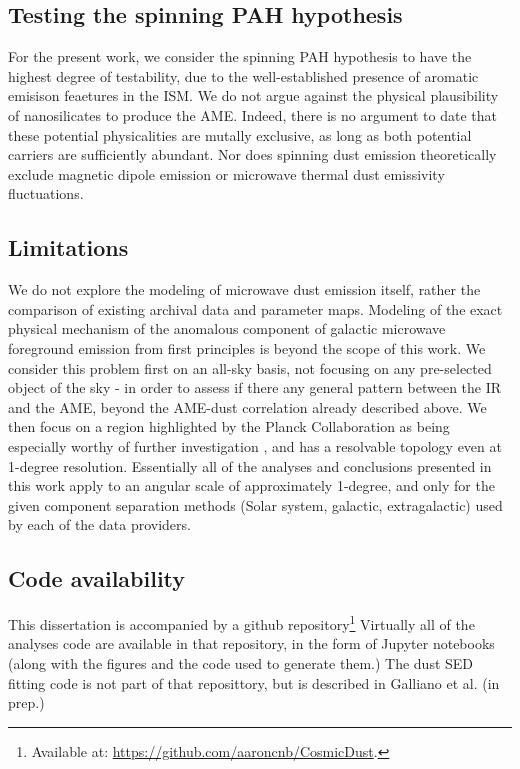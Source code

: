   \subsection{Testing the spinning PAH hypothesis}
    For the present work, we consider the spinning PAH hypothesis to have the highest degree of testability, due to the well-established presence of aromatic emisison feaetures in the ISM.  We do not argue against the physical plausibility of nanosilicates to produce the AME. Indeed, there is no argument to date that these potential physicalities are mutally exclusive, as long as both potential carriers are sufficiently abundant. Nor does spinning dust emission theoretically exclude magnetic dipole emission or microwave thermal dust emissivity fluctuations.

  \subsection{Limitations}
    We do not explore the modeling of microwave dust emission itself, rather the comparison of existing archival data and parameter maps. Modeling of the exact physical mechanism of the anomalous component of galactic microwave foreground emission from first principles is beyond the scope of this work. We consider this problem first on an all-sky basis, not focusing on any pre-selected object of the sky - in order to assess if there any general pattern between the IR and the AME, beyond the AME-dust correlation already described above. We then focus on a region highlighted by the Planck Collaboration as being especially worthy of further investigation \citep{planck15X}, and has a resolvable topology even at 1-degree resolution. Essentially all of the analyses and conclusions presented in this work apply to an angular scale of approximately 1-degree, and only for the given component separation methods (Solar system, galactic, extragalactic) used by each of the data providers.

  \subsection{Code availability}
    This dissertation is accompanied by a github repository\footnote{Available at: \url{https://github.com/aaroncnb/CosmicDust}.} Virtually all of the analyses code are available in that repository, in the form of Jupyter notebooks (along with the figures and the code used to generate them.) The dust SED fitting code is not part of that reposittory, but is described in Galliano et al. (in prep.)
